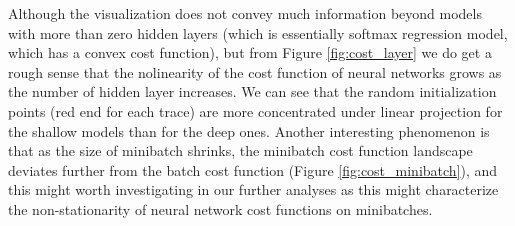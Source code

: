 Although the visualization does not convey much information beyond models with more
than zero hidden layers (which is essentially softmax regression model, which has a
convex cost function), but from Figure \ref{fig:cost_layer} we do get a rough sense 
that the nolinearity of the cost function of neural networks grows as the number
of hidden layer increases. We can see that the random initialization points (red end
for each trace) are more concentrated under linear projection
for the shallow models than for the deep ones. Another interesting phenomenon is that
as the size of minibatch shrinks, the minibatch cost function landscape deviates further
from the batch cost function (Figure \ref{fig:cost_minibatch}), and this might worth
investigating in our further analyses as this might characterize the non-stationarity
of neural network cost functions on minibatches.
